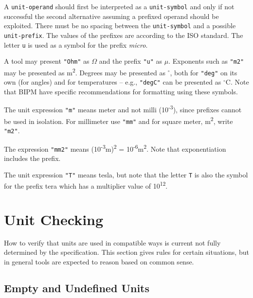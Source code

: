 A \lstinline[language=grammar]!unit-operand! should first be interpreted as a \lstinline[language=grammar]!unit-symbol! and only if not successful the second alternative assuming a prefixed operand should be exploited.
There must be no spacing between the \lstinline[language=grammar]!unit-symbol! and a possible \lstinline[language=grammar]!unit-prefix!.
The values of the prefixes are according to the ISO standard.
The letter \lstinline!u! is used as a symbol for the prefix \emph{micro}.

\begin{nonnormative}
A tool may present \lstinline!"Ohm"! as $\Omega$ and the prefix \lstinline!"u"! as $\mu$.
Exponents such as \lstinline!"m2"! may be presented as m\textsuperscript{2}.
Degrees may be presented as $^{\circ}$, both for \lstinline!"deg"! on its own (for angles) and for temperatures -- e.g., \lstinline!"degC"! can be presented as $^{\circ}$C.
Note that BIPM have specific recommendations for formatting using these symbols.
\end{nonnormative}

\begin{example}
The unit expression \lstinline!"m"! means meter and not milli (10\textsuperscript{-3}), since prefixes cannot be used in isolation.
For millimeter use \lstinline!"mm"! and for square meter, m\textsuperscript{2}, write \lstinline!"m2"!.

The expression \lstinline!"mm2"! means (10\textsuperscript{-3}m)\textsuperscript{2} = 10\textsuperscript{-6}m\textsuperscript{2}.
Note that exponentiation includes the prefix.

The unit expression \lstinline!"T"! means tesla, but note that the letter \lstinline!T! is also the symbol for the prefix tera which has a multiplier value of 10\textsuperscript{12}.
\end{example}


\section{Unit Checking}\label{unit-checking}

How to verify that units are used in compatible ways is current not fully determined by the specification.
This section gives rules for certain situations, but in general tools are expected to reason based on common sense.


\subsection{Empty and Undefined Units}\label{empty-and-undefined-units}

